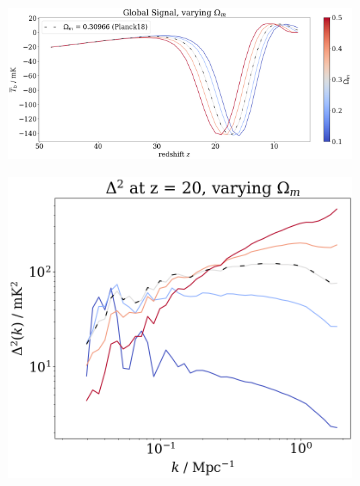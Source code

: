 \documentclass[floats,floatfix,showpacs,amssymb,prd,superscriptaddress,nofootinbib]{revtex4-2} %
\begin{document}
\begin{figure}[H]
     \centering
     \begin{subfigure}[b]{0.9\textwidth}
         \centering
         \includegraphics[width=\textwidth]{images/simulation_results/global_signal_Om.png}
         \label{fig:global_signal_Om}
     \end{subfigure}
     \hfill
     \begin{subfigure}[b]{0.45\textwidth}
         \centering
         \includegraphics[width=\textwidth]{images/simulation_results/power_spectrum_fixed_z_20_Om.png}
         \label{fig:power_spectrum_fixed_z_20_Om}
     \end{subfigure}
     \hfill
     \begin{subfigure}[b]{0.45\textwidth}
         \centering

\end{subfigure}
\end{figure}
\end{document}
